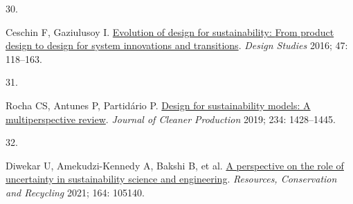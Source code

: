 \documentclass[
  11pt,
  a4paperpaper,
  onecolumn]{article}
\newlength{\cslhangindent}
\newlength{\csllabelwidth}
\newlength{\cslentryspacingunit} %
\newenvironment{CSLReferences}[2] %
 {%
  \setlength{\parindent}{0pt}
  \ifodd #1
  \let\oldpar\par
  \def\par{\hangindent=\cslhangindent\oldpar}
  \fi
  \setlength{\parskip}{#2\cslentryspacingunit}
 }%
 {}
\newcommand{\CSLLeftMargin}[1]{\parbox[t]{\csllabelwidth}{#1}}
\newcommand{\CSLRightInline}[1]{\parbox[t]{\linewidth - \csllabelwidth}{#1}\break}
\begin{document}
\begin{CSLReferences}{0}{0}
\leavevmode{}%
\CSLLeftMargin{30. }%
\CSLRightInline{Ceschin F, Gaziulusoy I.
\href{https://doi.org/10.1016/j.destud.2016.09.002}{Evolution of design
for sustainability: {From} product design to design for system
innovations and transitions}. \emph{Design Studies} 2016; 47: 118--163.}

\leavevmode{}%
\CSLLeftMargin{31. }%
\CSLRightInline{Rocha CS, Antunes P, Partidário P.
\href{https://doi.org/10.1016/j.jclepro.2019.06.108}{Design for
sustainability models: {A} multiperspective review}. \emph{Journal of
Cleaner Production} 2019; 234: 1428--1445.}

\leavevmode{}%
\CSLLeftMargin{32. }%
\CSLRightInline{Diwekar U, Amekudzi-Kennedy A, Bakshi B, et al.
\href{https://doi.org/10.1016/j.resconrec.2020.105140}{A perspective on
the role of uncertainty in sustainability science and engineering}.
\emph{Resources, Conservation and Recycling} 2021; 164: 105140.}

\end{CSLReferences}
\end{document}
